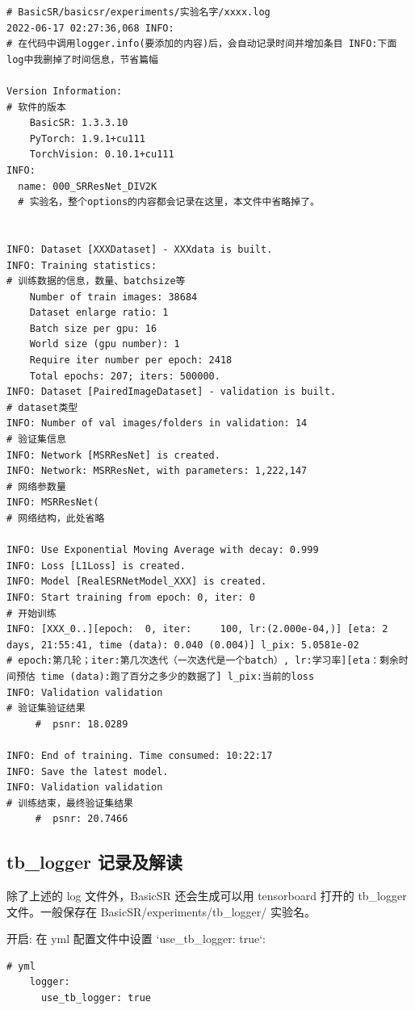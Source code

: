 \documentclass[../main.tex]{subfiles}
\begin{document}
\begin{verbatim}
# BasicSR/basicsr/experiments/实验名字/xxxx.log
2022-06-17 02:27:36,068 INFO:
# 在代码中调用logger.info(要添加的内容)后，会自动记录时间并增加条目 INFO:下面log中我删掉了时间信息，节省篇幅

Version Information:
# 软件的版本
    BasicSR: 1.3.3.10
    PyTorch: 1.9.1+cu111
    TorchVision: 0.10.1+cu111
INFO:
  name: 000_SRResNet_DIV2K
  # 实验名，整个options的内容都会记录在这里，本文件中省略掉了。


INFO: Dataset [XXXDataset] - XXXdata is built.
INFO: Training statistics:
# 训练数据的信息，数量、batchsize等
    Number of train images: 38684
    Dataset enlarge ratio: 1
    Batch size per gpu: 16
    World size (gpu number): 1
    Require iter number per epoch: 2418
    Total epochs: 207; iters: 500000.
INFO: Dataset [PairedImageDataset] - validation is built.
# dataset类型
INFO: Number of val images/folders in validation: 14
# 验证集信息
INFO: Network [MSRResNet] is created.
INFO: Network: MSRResNet, with parameters: 1,222,147
# 网络参数量
INFO: MSRResNet(
# 网络结构，此处省略

INFO: Use Exponential Moving Average with decay: 0.999
INFO: Loss [L1Loss] is created.
INFO: Model [RealESRNetModel_XXX] is created.
INFO: Start training from epoch: 0, iter: 0
# 开始训练
INFO: [XXX_0..][epoch:  0, iter:     100, lr:(2.000e-04,)] [eta: 2 days, 21:55:41, time (data): 0.040 (0.004)] l_pix: 5.0581e-02
# epoch:第几轮；iter:第几次迭代（一次迭代是一个batch）, lr:学习率][eta：剩余时间预估 time (data):跑了百分之多少的数据了] l_pix:当前的loss
INFO: Validation validation
# 验证集验证结果
     #  psnr: 18.0289

INFO: End of training. Time consumed: 10:22:17
INFO: Save the latest model.
INFO: Validation validation
# 训练结束，最终验证集结果
     #  psnr: 20.7466

\end{verbatim}

\subsection{tb\_logger 记录及解读}

除了上述的 log 文件外，BasicSR 还会生成可以用 tensorboard 打开的 tb\_logger 文件。一般保存在 BasicSR/experiments/tb\_logger/ 实验名。


开启: 在 yml 配置文件中设置 `use\_tb\_logger: true`:
\begin{verbatim}
# yml
    logger:
      use_tb_logger: true
\end{verbatim}
\end{document}
